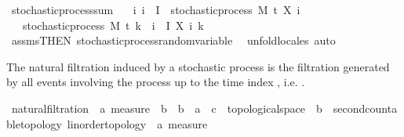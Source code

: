 \begin{isabellebody}
\endisatagproof
{\isafoldproof}%
%
\isadelimproof
%
\endisadelimproof
\isanewline
\isanewline
{}\isamarkupfalse%
\ stochastic{\isacharunderscore}{\kern0pt}process{\isacharunderscore}{\kern0pt}sum{\isacharcolon}{\kern0pt}\isanewline
\ \ \ {\isachardoublequoteopen}{\isasymAnd}i{\isachardot}{\kern0pt}\ i\ {\isasymin}\ I\ {\isasymLongrightarrow}\ stochastic{\isacharunderscore}{\kern0pt}process\ M\ t\ {\isacharparenleft}{\kern0pt}X\ i{\isacharparenright}{\kern0pt}{\isachardoublequoteclose}\isanewline
\ \ \ {\isachardoublequoteopen}stochastic{\isacharunderscore}{\kern0pt}process\ M\ t\ {\isacharparenleft}{\kern0pt}{\isasymlambda}k\ {\isasymxi}{\isachardot}{\kern0pt}\ {\isasymSum}i\ {\isasymin}\ I{\isachardot}{\kern0pt}\ X\ i\ k\ {\isasymxi}{\isacharparenright}{\kern0pt}{\isachardoublequoteclose}%
\isadelimproof
\ %
\endisadelimproof
%
\isatagproof
{}\isamarkupfalse%
\ assms{\isacharbrackleft}{\kern0pt}THEN\ stochastic{\isacharunderscore}{\kern0pt}process{\isachardot}{\kern0pt}random{\isacharunderscore}{\kern0pt}variable{\isacharbrackright}{\kern0pt}\ \isamarkupfalse%
\ {\isacharparenleft}{\kern0pt}unfold{\isacharunderscore}{\kern0pt}locales{\isacharcomma}{\kern0pt}\ auto{\isacharparenright}{\kern0pt}%
\endisatagproof
{\isafoldproof}%
%
\isadelimproof
%
\endisadelimproof
%
\isadelimdocument
%
\endisadelimdocument
%
\isatagdocument
%
\isamarkuptrue%
%
\endisatagdocument
{\isafolddocument}%
%
\isadelimdocument
%
\endisadelimdocument
%
\begin{isamarkuptext}%
The natural filtration induced by a stochastic process  is the filtration generated by all events involving the process up to the time index , i.e. .%
\end{isamarkuptext}\isamarkuptrue%
\isamarkupfalse%
\ natural{\isacharunderscore}{\kern0pt}filtration\ {\isacharcolon}{\kern0pt}{\isacharcolon}{\kern0pt}\ {\isachardoublequoteopen}{\isacharprime}{\kern0pt}a\ measure\ {\isasymRightarrow}\ {\isacharprime}{\kern0pt}b\ {\isasymRightarrow}\ {\isacharparenleft}{\kern0pt}{\isacharprime}{\kern0pt}b\ {\isasymRightarrow}\ {\isacharprime}{\kern0pt}a\ {\isasymRightarrow}\ {\isacharprime}{\kern0pt}c\ {\isacharcolon}{\kern0pt}{\isacharcolon}{\kern0pt}\ topological{\isacharunderscore}{\kern0pt}space{\isacharparenright}{\kern0pt}\ {\isasymRightarrow}\ {\isacharprime}{\kern0pt}b\ {\isacharcolon}{\kern0pt}{\isacharcolon}{\kern0pt}\ {\isacharbraceleft}{\kern0pt}second{\isacharunderscore}{\kern0pt}countable{\isacharunderscore}{\kern0pt}topology{\isacharcomma}{\kern0pt}\ linorder{\isacharunderscore}{\kern0pt}topology{\isacharbraceright}{\kern0pt}\ {\isasymRightarrow}\ {\isacharprime}{\kern0pt}a\ measure{\isachardoublequoteclose}\ \isanewline

\end{isabellebody}
